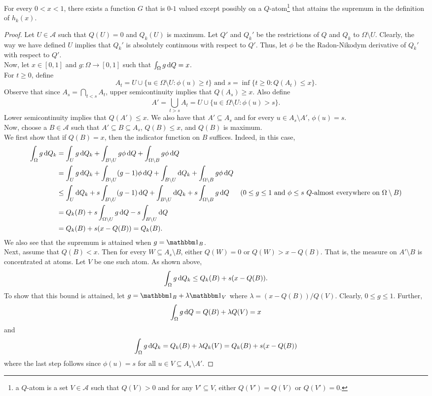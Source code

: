 \begin{lemma}
\label{hk distance supremum attained}
For every $0<x<1$, there exists a function $G$ that is $0$-$1$ valued except possibly on a $Q$-atom\footnote{a $Q$-atom is a set $V\in\mathcal{A}$ such that $Q(V)>0$ and for any $V'\subseteq V$, either $Q(V')=Q(V)$ or $Q(V')=0$.} that attains the supremum in the definition of $h_k(x)$.
\end{lemma}
\begin{proof}
Let $U\in\mathcal{A}$ such that $Q(U)=0$ and $Q_k(U)$ is maximum. Let $Q'$ and $Q_k'$ be the restrictions of $Q$ and $Q_k$ to $\Omega\setminus U$. Clearly, the way we have defined $U$ implies that $Q_k'$ is absolutely continuous with respect to $Q'$. Thus, let $\phi$ be the Radon-Nikodym derivative of $Q_k'$ with respect to $Q'$.\\
Now, let $x\in[0,1]$ and $g:\Omega\to[0,1]$ such that $\int_\Omega g\operatorname{d}\!{Q} = x$.\\
For $t\geq 0$, define
\[ A_t = U \cup \{u \in \Omega\setminus U : \phi(u) \geq t\}\text{ and }s=\inf\{t\geq 0 : Q(A_t) \leq x\}. \]
Observe that since $A_s = \bigcap_{t<s}A_t$, upper semicontinuity implies that $Q(A_s)\geq x$. Also define
\[ A' = \bigcup_{t>s} A_t = U \cup \{u \in \Omega\setminus U : \phi(u) > s\}. \]
Lower semicontinuity implies that $Q(A')\leq x$. We also have that $A'\subseteq A_s$ and for every $u\in A_s\setminus A'$, $\phi(u)=s$.\\
Now, choose a $B\in\mathcal{A}$ such that $A'\subseteq B\subseteq A_s$, $Q(B)\leq x$, and $Q(B)$ is maximum.\\
We first show that if $Q(B)=x$, then the indicator function on $B$ suffices. Indeed, in this case,
\begin{align*}
    \int_\Omega g\d{Q}_k &= \int_U g\d{Q}_k + \int_{B\setminus U} g\phi\d{Q} + \int_{\Omega\setminus B} g\phi\d{Q} \\
    &= \int_U g\d{Q}_k + \int_{B\setminus U} (g-1)\phi\d{Q} + \int_{B\setminus U} \d{Q}_k + \int_{\Omega\setminus B} g\phi\d{Q} \\
    &\leq \int_U \d{Q}_k + s\int_{B\setminus U} (g-1)\d{Q} + \int_{B\setminus U} \d{Q}_k + s\int_{\Omega\setminus B} g \d{Q} & \text{($0\leq g\leq 1$ and $\phi\leq s$ $Q$-almost everywhere on $\Omega\setminus B$)} \\
    &= Q_k(B) + s\int_{\Omega\setminus U} g\d{Q} - s\int_{B\setminus U}\d{Q} \\
    &= Q_k(B) + s(x - Q(B)) = Q_k(B).
\end{align*}
We also see that the supremum is attained when $g=\indic_B$.\\
Next, assume that $Q(B)<x$. Then for every $W\subseteq A_s\setminus B$, either $Q(W)=0$ or $Q(W)>x-Q(B)$. That is, the measure on $A'\setminus B$ is concentrated at atoms. Let $V$ be one such atom. As shown above,
\[ \int_\Omega g\operatorname{d}\!{Q}_k \leq Q_k(B) + s(x-Q(B)). \]
To show that this bound is attained, let $g=\indic_B+\lambda\indic_{V}$ where $\lambda = (x-Q(B))/Q(V)$. Clearly, $0\leq g\leq 1$. Further,
\[ \int_\Omega g\operatorname{d}\!{Q} = Q(B) + \lambda Q(V) = x \]
and
\[ \int_\Omega g\operatorname{d}\!{Q}_k = Q_k(B)+\lambda Q_k(V) = Q_k(B) + s(x-Q(B)) \]
where the last step follows since $\phi(u)=s$ for all $u\in V\subseteq A_s\setminus A'$.
\end{proof}

